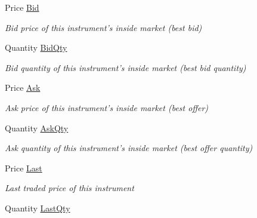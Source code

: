\begin{DoxyCompactItemize}
Price \hyperlink{class_e_z_a_p_i_1_1_containers_1_1_t_t_instrument_ab339c987cd7ceeedaf2b4ec94cbc532a}{Bid}
\begin{DoxyCompactList}\small\item\em Bid price of this instrument's inside market (best bid) \end{DoxyCompactList}\item 
Quantity \hyperlink{class_e_z_a_p_i_1_1_containers_1_1_t_t_instrument_a5e005c3504b652c6f117875195c03692}{Bid\-Qty}
\begin{DoxyCompactList}\small\item\em Bid quantity of this instrument's inside market (best bid quantity) \end{DoxyCompactList}\item 
Price \hyperlink{class_e_z_a_p_i_1_1_containers_1_1_t_t_instrument_a960e5cb420f198c3e8c18a1bc877ea24}{Ask}
\begin{DoxyCompactList}\small\item\em Ask price of this instrument's inside market (best offer) \end{DoxyCompactList}\item 
Quantity \hyperlink{class_e_z_a_p_i_1_1_containers_1_1_t_t_instrument_a027537695888a620318cf012281d421e}{Ask\-Qty}
\begin{DoxyCompactList}\small\item\em Ask quantity of this instrument's inside market (best offer quantity) \end{DoxyCompactList}\item 
Price \hyperlink{class_e_z_a_p_i_1_1_containers_1_1_t_t_instrument_aca64b41e159a6f32285ba63d20be77a1}{Last}
\begin{DoxyCompactList}\small\item\em Last traded price of this instrument \end{DoxyCompactList}\item 
Quantity \hyperlink{class_e_z_a_p_i_1_1_containers_1_1_t_t_instrument_aa8c0b55bf3f9321f09f10769a1b5fac3}{Last\-Qty}

\end{DoxyCompactItemize}
